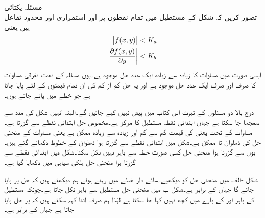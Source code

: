 \quad مسئلہ یکتائی\\
تصور کریں کہ شکل  کے مستطیل میں تمام نقطوں  پر  اور  استمراری اور محدود تفاعل ہیں یعنی
\begin{align}
\abs{f(x,y)} &< K_a \label{مساوات_سادہ_اول_وجودیت_ت} \\
\abs{\frac{\partial f(x,y)}{\partial y}}&< K_b \label{مساوات_سادہ_اول_وجودیت_ٹ}
\end{align} 
ایسی صورت میں مساوات  کا زیادہ سے زیادہ ایک عدد حل  موجود ہے۔یوں مسئلہ  کے تحت  تفرقی مساوات کا صرف اور صرف ایک عدد حل موجود ہے اور یہ حل  کم از کم  کی ان تمام قیمتوں کے لئے  پایا جاتا ہے جو  خطے میں پائے جاتے ہوں۔

درج بالا دو مسئلوں کے ثبوت اس کتاب میں پیش نہیں کیے جائیں گے۔البتہ انہیں شکل  کی مدد سے سمجھا جا سکتا ہے جہاں ابتدائی نقطہ  مستطیل  کا مرکز ہے۔مخصوص حل ابتدائی نقطے سے گزرتا ہے۔مساوات  کے تحت  یعنی  کی قیمت کم سے کم  اور زیادہ سے زیادہ  ممکن ہے یعنی مساوات  کے منحنی حل کی ڈھلوان  تا  ممکن ہے۔شکل میں ابتدائی نقطے سے گزرتا ہوا  ڈھلوان کے خطوط دکھائے گئے ہیں۔یوں  سے گزرتا ہوا منحنی حل کسی صورت  خطہ  سے باہر نہیں نکل سکتا۔شکل میں ابتدائی نقطے سے گزرتا ہوا منحنی حل ہلکی سیاہی میں دکھایا گیا ہے۔

شکل -الف میں منحنی حل کو دیکھیے۔سائے دار خطے میں رہتے ہوئے ہم دیکھتے ہیں کہ حل  پر پایا جائے گا جہاں  کے برابر ہے۔شکل-ب میں منحنی حل مستطیل  سے باہر نکل جاتا ہے۔چونکہ مستطیل کے باہر  اور  کے بارے میں کچھ نہیں کہا جا سکتا ہے لہٰذا ہم صرف اتنا کہہ سکتے ہیں کہ  پر حل پایا جاتا ہے جہاں  کے برابر ہے۔

